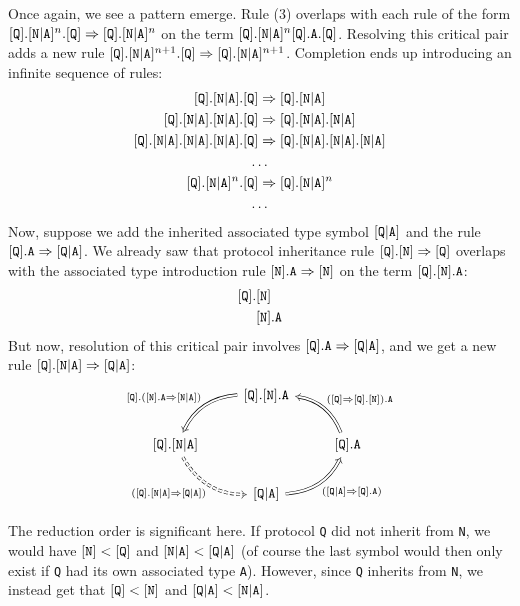 \documentclass[../generics]{subfiles}
\begin{document}
Once again, we see a pattern emerge. Rule (3) overlaps with each rule of the form $[\texttt{Q}].[\texttt{N}|\texttt{A}]^n.[\texttt{Q}]\Rightarrow[\texttt{Q}].[\texttt{N}|\texttt{A}]^n$ on the term $[\texttt{Q}].[\texttt{N}|\texttt{A}]^n[\texttt{Q}].\texttt{A}.[\texttt{Q}]$. Resolving this critical pair adds a new rule $[\texttt{Q}].[\texttt{N}|\texttt{A}]^{n+1}.[\texttt{Q}]\Rightarrow[\texttt{Q}].[\texttt{N}|\texttt{A}]^{n+1}$. Completion ends up introducing an infinite sequence of rules:
\begin{gather*}
\protosym{Q}.\assocsym{N}{A}.\protosym{Q}\Rightarrow\protosym{Q}.\assocsym{N}{A}\\
\protosym{Q}.\assocsym{N}{A}.\assocsym{N}{A}.\protosym{Q}\Rightarrow\protosym{Q}.\assocsym{N}{A}.\assocsym{N}{A}\\
\protosym{Q}.\assocsym{N}{A}.\assocsym{N}{A}.\assocsym{N}{A}.\protosym{Q}\Rightarrow\protosym{Q}.\assocsym{N}{A}.\assocsym{N}{A}.\assocsym{N}{A}\\
\ldots\\
\protosym{Q}.\assocsym{N}{A}^n.\protosym{Q}\Rightarrow\protosym{Q}.\assocsym{N}{A}^n\\
\ldots
\end{gather*}
Now, suppose we add the inherited associated type symbol $[\texttt{Q}|\texttt{A}]$ and the rule $[\texttt{Q}].\texttt{A}\Rightarrow[\texttt{Q}|\texttt{A}]$. We already saw that protocol inheritance rule $[\texttt{Q}].[\texttt{N}]\Rightarrow[\texttt{Q}]$ overlaps with the associated type introduction rule $[\texttt{N}].\texttt{A}\Rightarrow[\texttt{N}]$ on the term $[\texttt{Q}].[\texttt{N}].\texttt{A}$:
\begin{align*}
[\texttt{Q}].&[\texttt{N}]\\
&[\texttt{N}].\texttt{A}
\end{align*}
But now, resolution of this critical pair involves $[\texttt{Q}].\texttt{A}\Rightarrow[\texttt{Q}|\texttt{A}]$, and we get a new rule $[\texttt{Q}].[\texttt{N}|\texttt{A}]\Rightarrow[\texttt{Q}|\texttt{A}]$:
\[
\FourLoopDerived%
{\protosym{Q}.\protosym{N}.\texttt{A}}%
{\protosym{Q}.\assocsym{N}{A}}%
{\assocsym{Q}{A}}%
{\protosym{Q}.\texttt{A}}%
{\protosym{Q}.(\protosym{N}.\texttt{A}\Rightarrow\assocsym{N}{A})}%
{(\protosym{Q}.\assocsym{N}{A}\Rightarrow\assocsym{Q}{A})}%
{(\assocsym{Q}{A}\Rightarrow\protosym{Q}.\texttt{A})}%
{(\protosym{Q}\Rightarrow\protosym{Q}.\protosym{N}).\texttt{A}}
\]

The reduction order is significant here. If protocol \texttt{Q} did not inherit from \texttt{N}, we would have $[\texttt{N}]<[\texttt{Q}]$ and $[\texttt{N}|\texttt{A}]<[\texttt{Q}|\texttt{A}]$ (of course the last symbol would then only exist if \texttt{Q} had its own associated type \texttt{A}). However, since \texttt{Q} inherits from \texttt{N}, we instead get that $[\texttt{Q}]<[\texttt{N}]$ and $[\texttt{Q}|\texttt{A}]<[\texttt{N}|\texttt{A}]$.
\end{document}
